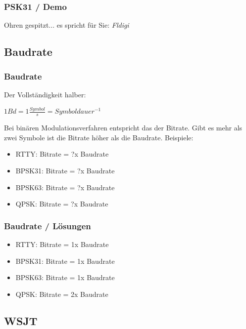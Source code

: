 \begin{frame}
    \frametitle{PSK31 / Demo}

    \Large{Ohren gespitzt... es spricht für Sie: \emph{Fldigi}}

\end{frame}

\subsection{Baudrate}

\begin{frame}
    \frametitle{Baudrate}

    Der Vollständigkeit halber: \\[2em]

    \begin{center}
        $1 Bd = 1 \frac{Symbol}{s} = Symboldauer^{-1}$
    \end{center}

    Bei binären Modulationsverfahren entspricht das der Bitrate. Gibt es mehr
    als zwei Symbole ist die Bitrate höher als die Baudrate. Beispiele:

    \begin{itemize}
        \item RTTY: Bitrate = ?x Baudrate
        \item BPSK31: Bitrate = ?x Baudrate
        \item BPSK63: Bitrate = ?x Baudrate
        \item QPSK: Bitrate = ?x Baudrate
    \end{itemize}

\end{frame}

\begin{frame}
    \frametitle{Baudrate / Lösungen}

    \begin{itemize}
        \item RTTY: Bitrate = 1x Baudrate
        \item BPSK31: Bitrate = 1x Baudrate
        \item BPSK63: Bitrate = 1x Baudrate
        \item QPSK: Bitrate = 2x Baudrate
    \end{itemize}

\end{frame}

\subsection{WSJT}

